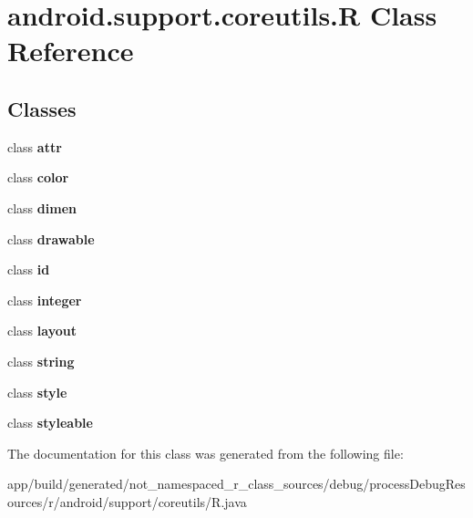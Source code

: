 \hypertarget{classandroid_1_1support_1_1coreutils_1_1_r}{}\section{android.\+support.\+coreutils.\+R Class Reference}
\label{classandroid_1_1support_1_1coreutils_1_1_r}
\subsection*{Classes}
\begin{DoxyCompactItemize}
\item 
class {\bfseries attr}
\item 
class {\bfseries color}
\item 
class {\bfseries dimen}
\item 
class {\bfseries drawable}
\item 
class {\bfseries id}
\item 
class {\bfseries integer}
\item 
class {\bfseries layout}
\item 
class {\bfseries string}
\item 
class {\bfseries style}
\item 
class {\bfseries styleable}
\end{DoxyCompactItemize}


The documentation for this class was generated from the following file\+:\begin{DoxyCompactItemize}
\item 
app/build/generated/not\+\_\+namespaced\+\_\+r\+\_\+class\+\_\+sources/debug/process\+Debug\+Resources/r/android/support/coreutils/R.\+java\end{DoxyCompactItemize}
